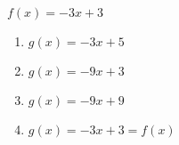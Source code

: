 \item $f(x)=-3x+3$

\begin{enumerate}
\item $g(x) = -3x+5$
\item $g(x) = -9x+3$
\item $g(x) = -9x+9$
\item $g(x) = -3x+3 = f(x)$  
\end{enumerate}
